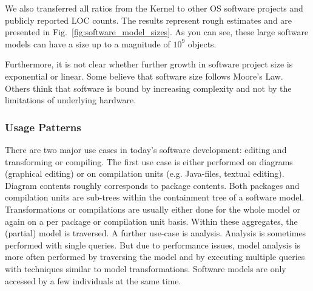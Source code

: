 We also transferred all ratios from the Kernel to other OS software projects and publicly reported LOC counts. The results represent rough estimates and are presented in Fig.~\ref{fig:software_model_sizes}. As you can see, these large software models can have a size up to a magnitude of $10^9$ objects.

Furthermore, it is not clear whether further growth in software project size is exponential or linear. Some believe that software size follows Moore's Law. Others think that software is bound by increasing complexity and not by the limitations of underlying hardware.

\subsubsection*{Usage Patterns}
There are two major use cases in today's software development: editing and transforming or compiling. The first use case is either performed on diagrams (graphical editing) or on compilation units (e.g. Java-files, textual editing). Diagram contents roughly corresponds to package contents. Both packages and compilation units are sub-trees within the containment tree of a software model.  Transformations or compilations are usually either done for the whole model or again on a per package or compilation unit basis. Within these aggregates, the (partial) model is traversed. A further use-case is analysis. Analysis is sometimes performed with single queries. But due to performance issues, model analysis is more often performed by traversing the model and by executing multiple queries with techniques similar to model transformations. Software models are only accessed by a few individuals at the same time.

